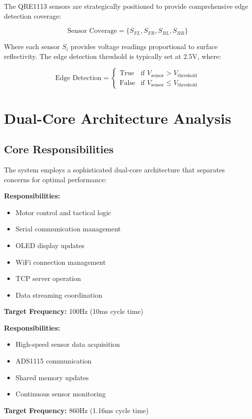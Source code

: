 \documentclass[12pt,a4paper]{article}
\begin{document}
The QRE1113 sensors are strategically positioned to provide comprehensive edge detection coverage:

\begin{equation}
\text{Sensor Coverage} = \{S_{FL}, S_{FR}, S_{BL}, S_{BR}\}
\end{equation}

Where each sensor $S_i$ provides voltage readings proportional to surface reflectivity. The edge detection threshold is typically set at 2.5V, where:

\begin{equation}
\text{Edge Detection} = \begin{cases}
\text{True} & \text{if } V_{\text{sensor}} > V_{\text{threshold}} \\
\text{False} & \text{if } V_{\text{sensor}} \leq V_{\text{threshold}}
\end{cases}
\end{equation}

\section{Dual-Core Architecture Analysis}

\subsection{Core Responsibilities}

The system employs a sophisticated dual-core architecture that separates concerns for optimal performance:

\begin{tcolorbox}[colback=green!5!white,colframe=green!75!black,title=Core 0 (Primary Core)]
\textbf{Responsibilities:}
\begin{itemize}
    \item Motor control and tactical logic
    \item Serial communication management
    \item OLED display updates
    \item WiFi connection management
    \item TCP server operation
    \item Data streaming coordination
\end{itemize}
\textbf{Target Frequency:} 100Hz (10ms cycle time)
\end{tcolorbox}

\begin{tcolorbox}[colback=orange!5!white,colframe=orange!75!black,title=Core 1 (Secondary Core)]
\textbf{Responsibilities:}
\begin{itemize}
    \item High-speed sensor data acquisition
    \item ADS1115 communication
    \item Shared memory updates
    \item Continuous sensor monitoring
\end{itemize}
\textbf{Target Frequency:} 860Hz (1.16ms cycle time)
\end{tcolorbox}
\end{document}
